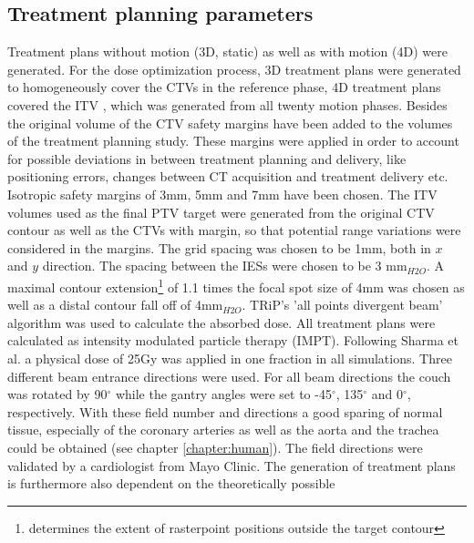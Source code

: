 \documentclass[type=dr, dr=rernat, accentcolor=tud7b,colorbacktitle, bigchapter, openright, twoside, 12pt ]{tudthesis}
\begin{document}
\subsection{Treatment planning parameters}
\label{mdacc:tpp}
Treatment plans without motion (3D, static) as well as with motion (4D) were generated. 
For the dose optimization process, 3D treatment plans were generated to homogeneously cover the CTVs in the reference phase, 4D treatment
plans covered the ITV \cite{Gra12}, which was generated from all twenty motion phases. 
Besides the original volume of the CTV safety margins have been added to the volumes of the treatment planning study. These margins were applied 
in order to account for possible deviations in between treatment planning and delivery, like positioning errors, changes 
between CT acquisition and treatment delivery etc. Isotropic safety margins of 3mm, 5mm and 7mm have been chosen. The ITV volumes used as the 
final PTV target were generated from the original CTV contour as well as the CTVs with margin, so that potential range variations were 
considered in the margins.\newline
\newline
The grid spacing was chosen to be 1$\mathrm{mm}$, both in $x$ and $y$ direction. The spacing between the IESs were chosen to be 3 mm$_{H2O}$. 
A maximal contour extension\footnote{determines the extent of rasterpoint positions outside the target contour} of 1.1 times the focal 
spot size of 4mm was chosen as well as a distal contour fall off of 4mm$_{H2O}$. TRiP's 'all points divergent beam' algorithm was used to 
calculate the absorbed dose. All treatment plans were calculated as intensity modulated particle therapy (IMPT). 
Following Sharma et al. \cite{Sha10} a physical dose of 25Gy was applied in one fraction in all simulations.\newline
\newline
Three different beam entrance directions were used. For all beam directions the couch was rotated by 90$^{\circ}$ while the 
gantry angles were set to -45$^{\circ}$, 135$^{\circ}$ and 0$^{\circ}$, respectively. With these field number and directions a good sparing 
of normal tissue, especially of the coronary arteries as well as the aorta and the trachea  could be obtained (see chapter \ref{chapter:human}). 
The field directions were validated by a cardiologist from Mayo Clinic.\newline
\newline
The generation of treatment plans is furthermore also dependent on the theoretically possible 
\end{document}
